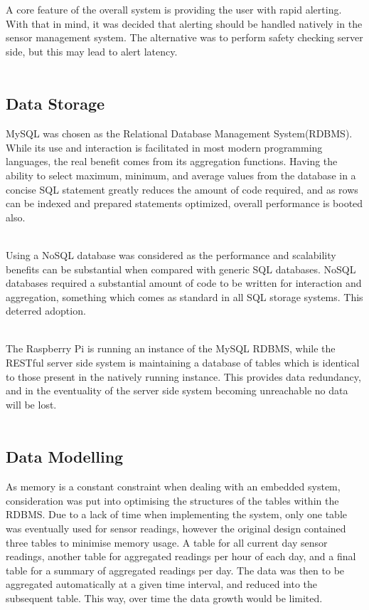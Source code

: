 \documentclass{article}
\begin{document}
A core feature of the overall system is providing the user with rapid alerting. With that in mind, it was decided that alerting should be handled natively in the sensor management system. The alternative was to perform safety checking server side, but this may lead to alert latency. \\\

\subsection{Data Storage}
MySQL was chosen as the Relational Database Management System(RDBMS). While its use and interaction is facilitated in most modern programming languages, the real benefit comes from its aggregation functions. Having the ability to select maximum, minimum, and average values from the database in a concise SQL statement greatly reduces the amount of code required, and as rows can be indexed and prepared statements optimized, overall performance is booted also. \\\

Using a NoSQL database was considered as the performance and scalability benefits can be substantial when compared with generic SQL databases. NoSQL databases required a substantial amount of code to be written for interaction and aggregation, something which comes as standard in all SQL storage systems. This deterred adoption. \\\

The Raspberry Pi is running an instance of the MySQL RDBMS, while the RESTful server side system is maintaining a database of tables which is identical to those present in the natively running instance. This provides data redundancy, and in the eventuality of the server side system becoming unreachable no data will be lost. \\\
\subsection{Data Modelling}
As memory is a constant constraint when dealing with an embedded system, consideration was put into optimising the structures of the tables within the RDBMS. Due to a lack of time when implementing the system, only one table was eventually used for sensor readings, however the original design contained three tables to minimise memory usage. A table for all current day sensor readings, another table for aggregated readings per hour of each day, and a final table for a summary of aggregated readings per day. The data was then to be aggregated automatically at a given time interval, and reduced into the subsequent table. This way, over time the data growth would be limited. \\\
\end{document}
